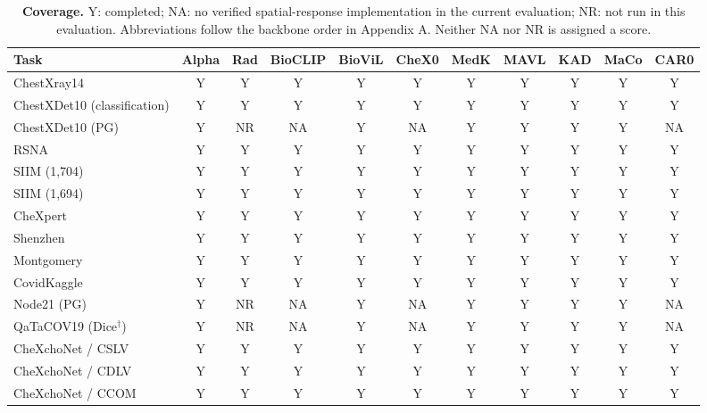 \begin{table}[tp]
\centering
\caption{\textbf{Coverage.} Y: completed; NA: no verified spatial-response implementation in the current evaluation; NR: not run in this evaluation. Abbreviations follow the backbone order in Appendix A. Neither NA nor NR is assigned a score.}
\label{tab:supp-coverage}
\footnotesize
\setlength{\tabcolsep}{4pt}
\begin{tabular*}{\textwidth}{@{\extracolsep{\fill}}lcccccccccc@{}}
\toprule
Task & Alpha & Rad & BioCLIP & BioViL & CheX0 & MedK & MAVL & KAD & MaCo & CAR0 \\
\midrule
ChestXray14 & Y & Y & Y & Y & Y & Y & Y & Y & Y & Y \\
ChestXDet10 (classification) & Y & Y & Y & Y & Y & Y & Y & Y & Y & Y \\
ChestXDet10 (PG) & Y & NR & NA & Y & NA & Y & Y & Y & Y & NA \\
RSNA & Y & Y & Y & Y & Y & Y & Y & Y & Y & Y \\
SIIM (1,704) & Y & Y & Y & Y & Y & Y & Y & Y & Y & Y \\
SIIM (1,694) & Y & Y & Y & Y & Y & Y & Y & Y & Y & Y \\
CheXpert & Y & Y & Y & Y & Y & Y & Y & Y & Y & Y \\
Shenzhen & Y & Y & Y & Y & Y & Y & Y & Y & Y & Y \\
Montgomery & Y & Y & Y & Y & Y & Y & Y & Y & Y & Y \\
CovidKaggle & Y & Y & Y & Y & Y & Y & Y & Y & Y & Y \\
Node21 (PG) & Y & NR & NA & Y & NA & Y & Y & Y & Y & NA \\
QaTaCOV19 (Dice$^\dagger$) & Y & NR & NA & Y & NA & Y & Y & Y & Y & NA \\
CheXchoNet / CSLV & Y & Y & Y & Y & Y & Y & Y & Y & Y & Y \\
CheXchoNet / CDLV & Y & Y & Y & Y & Y & Y & Y & Y & Y & Y \\
CheXchoNet / CCOM & Y & Y & Y & Y & Y & Y & Y & Y & Y & Y \\
\bottomrule
\end{tabular*}
\end{table}

